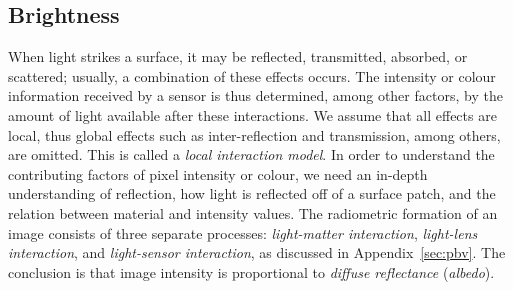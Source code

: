 


\subsection{Brightness}
When light strikes a surface, it may be reflected, transmitted, absorbed, or scattered; usually, a combination of these effects occurs. The intensity or colour information received by a sensor is thus determined, among other factors, by the amount of light available after these interactions. We assume that all effects are local, thus global effects such as inter-reflection and transmission, among others, are omitted. This is called a \textit{local interaction model}. In order to understand the contributing factors of pixel intensity or colour, we need an in-depth understanding of reflection, \ie how light is reflected off of a surface patch, and the relation between material and intensity values. The radiometric formation of an image consists of three separate processes: \textit{light-matter interaction}, \textit{light-lens interaction}, and \textit{light-sensor interaction}, as discussed in Appendix~\ref{sec:pbv}. The conclusion is that image intensity is proportional to \textit{diffuse reflectance} (\textit{albedo}).

